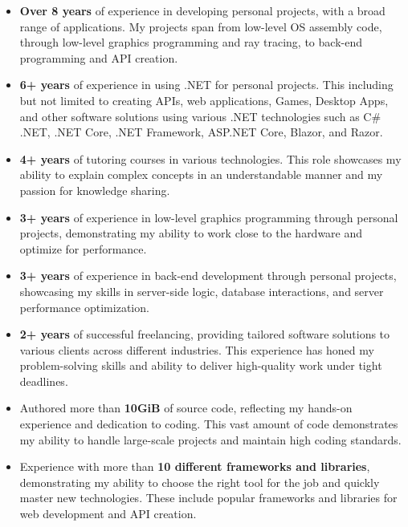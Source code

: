 \documentclass[10pt,a4paper]{altacv}
\begin{document}
\begin{itemize}
\item \textbf{Over 8 years} of experience in developing personal projects, with a broad range of applications. My projects span from low-level OS assembly code, through low-level graphics programming and ray tracing, to back-end programming and API creation.
\item \textbf{6+ years} of experience in using .NET for personal projects. This including but not limited to creating APIs, web applications, Games, Desktop Apps, and other software solutions using various .NET technologies such as C\# .NET, .NET Core, .NET Framework, ASP.NET Core, Blazor, and Razor.
\item \textbf{4+ years} of tutoring courses in various technologies. This role showcases my ability to explain complex concepts in an understandable manner and my passion for knowledge sharing.
\item \textbf{3+ years} of experience in low-level graphics programming through personal projects, demonstrating my ability to work close to the hardware and optimize for performance.
\item \textbf{3+ years} of experience in back-end development through personal projects, showcasing my skills in server-side logic, database interactions, and server performance optimization.
\item \textbf{2+ years} of successful freelancing, providing tailored software solutions to various clients across different industries. This experience has honed my problem-solving skills and ability to deliver high-quality work under tight deadlines.
\item Authored more than \textbf{10GiB} of source code, reflecting my hands-on experience and dedication to coding. This vast amount of code demonstrates my ability to handle large-scale projects and maintain high coding standards.
\item Experience with more than \textbf{10 different frameworks and libraries}, demonstrating my ability to choose the right tool for the job and quickly master new technologies. These include popular frameworks and libraries for web development and API creation.
\end{itemize}
\end{document}
